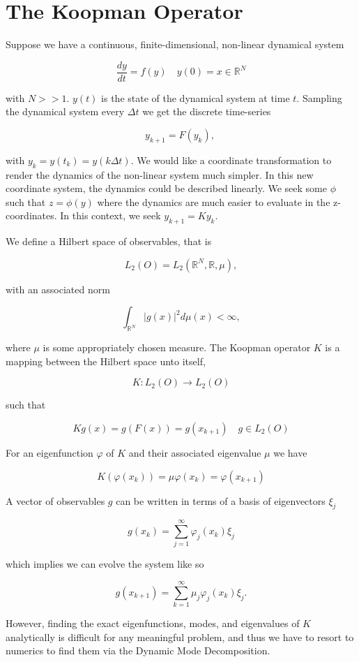 \section{The Koopman Operator}
Suppose we have a continuous, finite-dimensional, non-linear dynamical system 

$$
\frac{dy}{dt} = f(y) \quad y(0) = x \in \mathbb{R}^N
$$

\noindent with $N>>1$. $y(t)$ is the state of the dynamical system at time $t$. Sampling the dynamical
system every $\Delta t$ we get the discrete time-series

$$
y_{k+1} = F(y_k),\
$$

\noindent with $y_k = y(t_k) = y(k \Delta t)$. We would like a coordinate transformation to render the dynamics of the
 non-linear system much simpler. In this new coordinate system, the dynamics could be
described linearly. We seek some $\phi$ such
that $z = \phi(y)$ where the dynamics are much easier to evaluate in the
 z-coordinates. In this context, we seek $y_{k+1} = Ky_k$.


 \noindent We define a Hilbert space of observables, that is 

$$
L_2(O) = L_2(\mathbb{R}^N, \mathbb{R}, \mu),
$$

\noindent with an associated norm 

$$
\int_{\mathbb{R}^N} |g(x) |^2 d\mu(x)  < \infty,
$$

\noindent where $\mu$ is some appropriately chosen measure. The Koopman
operator $K$ is a mapping between the Hilbert space unto itself,

$$
K: L_2(O) \rightarrow L_2(O)
$$

\noindent such that

$$
Kg(x) = g(F(x)) = g(x_{k+1}) \quad g \in L_2(O)
$$

\noindent For an eigenfunction $\varphi$ of $K$ and their associated eigenvalue $\mu$ we have 


$$
K(\varphi(x_k)) = \mu \varphi(x_k) = \varphi(x_{k+1})
$$

\noindent A vector of observables $g$ can be written in terms of a basis of eigenvectors $\xi_j$

$$
g(x_{k}) = \sum^{\infty}_{j=1}\varphi_j(x_k) \xi_j
$$

\noindent which implies we can evolve the system like so

$$
g(x_{k+1}) = \sum^{\infty}_{k=1} \mu_j \varphi_j(x_k) \xi_j.
$$

\noindent However, finding the exact eigenfunctions, modes, and eigenvalues of $K$ analytically
is difficult for any meaningful problem, and thus we have to resort to
numerics to find them via the Dynamic Mode Decomposition.


